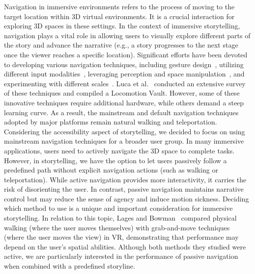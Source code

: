 {Navigation in immersive environments refers to the process of moving to the target location within 3D virtual environments. It is a crucial interaction for exploring 3D spaces in these settings. In the context of immersive storytelling, navigation plays a vital role in allowing users to visually explore different parts of the story and advance the narrative (e.g., a story progresses to the next stage once the viewer reaches a specific location).
Significant efforts have been devoted to developing various navigation techniques, including gesture design~\cite{tursunov2024creating}, utilizing different input modalities~\cite{swidrak2024beyond}, leveraging perception and space manipulation~\cite{dong2021tailored}, and experimenting with different scales~\cite{mirhosseini2019exploration, abtahi2019m}. 
Luca et al.~\cite{di2021locomotion} conducted an extensive survey of these techniques and compiled a Locomotion Vault. However, some of these innovative techniques require additional hardware, while others demand a steep learning curve.
As a result, the mainstream and default navigation techniques adopted by major platforms remain natural walking and teleportation. Considering the accessibility aspect of storytelling, we decided to focus on using mainstream navigation techniques for a broader user group. In many immersive applications, users need to actively navigate the 3D space to complete tasks. However, in storytelling, we have the option to let users passively follow a predefined path without explicit navigation actions (such as walking or teleportation).
While active navigation provides more interactivity, it carries the risk of disorienting the user. In contrast, passive navigation maintains narrative control but may reduce the sense of agency and induce motion sickness. Deciding which method to use is a unique and important consideration for immersive storytelling.
In relation to this topic, Lages and Bowman~\cite{lages2018move} compared physical walking (where the user moves themselves) with grab-and-move techniques (where the user moves the view) in VR, demonstrating that performance may depend on the user's spatial abilities. Although both methods they studied were active, we are particularly interested in the performance of passive navigation when combined with a predefined storyline.}